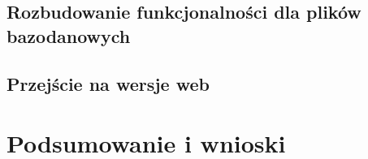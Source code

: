 \documentclass[12pt,a4paper,twoside]{article}
\begin{document}
\subsection{Rozbudowanie funkcjonalności dla plików bazodanowych}
\subsection{Przejście na wersje web}
\section*{Podsumowanie i wnioski}
\listoffigures
\end{document}
